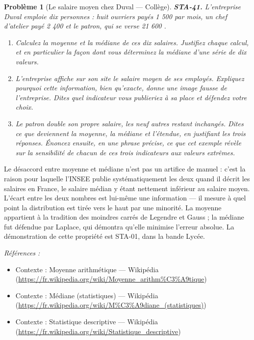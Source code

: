 \documentclass[11pt]{article}
\newtheorem{problem}{Problème}
\newenvironment{refs}{\par\small\noindent\emph{Références :}\begin{itemize}\setlength\itemsep{0pt}}{\end{itemize}\normalsize}
\begin{document}
\begin{problem}[{Le salaire moyen chez Duval --- Collège}]
\textbf{STA-41.} L'entreprise Duval emploie dix personnes : huit ouvriers payés 1 500 \texteuro{} par
mois, un chef d'atelier payé 2 400 \texteuro{} et le patron, qui se verse 21 600 \texteuro{}.
\begin{enumerate}
\item[(a)] Calculez la moyenne et la médiane de ces dix salaires. Justifiez chaque calcul, et en
particulier la façon dont vous déterminez la médiane d'une série de dix valeurs.
\item[(b)] L'entreprise affiche sur son site le salaire moyen de ses employés. Expliquez pourquoi cette
information, bien qu'exacte, donne une image fausse de l'entreprise. Dites quel indicateur vous
publieriez à sa place et défendez votre choix.
\item[(c)] Le patron double son propre salaire, les neuf autres restant inchangés. Dites ce que
deviennent la moyenne, la médiane et l'étendue, en justifiant les trois réponses. Énoncez ensuite,
en une phrase précise, ce que cet exemple révèle sur la sensibilité de chacun de ces trois
indicateurs aux valeurs extrêmes.
\end{enumerate}

\end{problem}

\noindent Le désaccord entre moyenne et médiane n'est pas un artifice de manuel : c'est la
raison pour laquelle l'INSEE publie systématiquement les deux quand il décrit les salaires en
France, le salaire médian y étant nettement inférieur au salaire moyen. L'écart entre les deux
nombres est lui-même une information --- il mesure à quel point la distribution est tirée vers le
haut par une minorité. La moyenne appartient à la tradition des moindres carrés de Legendre et
Gauss ; la médiane fut défendue par Laplace, qui démontra qu'elle minimise l'erreur absolue. La
démonstration de cette propriété est STA-01, dans la bande Lycée.

\begin{refs}
\item Contexte : Moyenne arithmétique --- Wikipédia (\url{https://fr.wikipedia.org/wiki/Moyenne_arithm%C3%A9tique})
\item Contexte : Médiane (statistiques) --- Wikipédia (\url{https://fr.wikipedia.org/wiki/M%C3%A9diane_(statistiques)})
\item Contexte : Statistique descriptive --- Wikipédia (\url{https://fr.wikipedia.org/wiki/Statistique_descriptive})
\end{refs}
\end{document}
